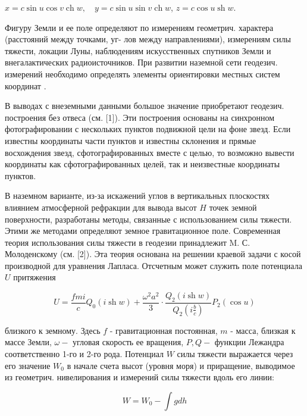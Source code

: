 \documentclass[10pt]{article}
\begin{document}
$x=c \sin u \cos v \operatorname{ch} w, \quad y=c \sin u \sin v \operatorname{ch} w$, $z=c \cos u \operatorname{sh} w$.



Фигуру Земли и ее поле определяют по измерениям геометрич. характера (расстояний между точками, уг- лов между направлениями), измерениям силы тяжести, локации Луны, наблюдениям искусственных спутников Земли и внегалактических радиоисточников. При развитии наземной сети геодезич. измерений необходимо определять элементы ориентировки местных систем координат .



В выводах с внеземными данными большое значение приобретают геодезич. построения без отвеса (см. [1]). Эти построения основаны на синхронном фотографировании с нескольких пунктов подвижной цели на фоне звезд. Если известны координаты части пунктов и известны склонения и прямые восхождения звезд, сфотографированных вместе с целью, то возможно вывести координаты как сфотографированных целей, так и неизвестные координаты пунктов.



В наземном варианте, из-за искажений углов в вертикальных плоскостях влиянием атмосферной рефракции для вывода высот $H$ точек земной поверхности, разработаны методы, связанные с использованием силы тяжести. Этими же методами определяют земное гравитационное поле. Современная теория использования силы тяжести в геодезии принадлежит M. С. Молоденскому (см. [2]). Эта теория основана на решении краевой задачи с косой производной для уравнения Лапласа. Отсчетным может служить поле потенциала $U$ притяжения



\[

U=\frac{f m i}{c} Q_{0}(i \operatorname{sh} w)+\frac{\omega^{2} a^{2}}{3} \cdot \frac{Q_{2}(i \operatorname{sh} w)}{Q_{2}\left(i \frac{b}{c}\right)} P_{2}(\cos u)

\]



близкого к земному. Здесь $f$ - гравитационная постоянная, $m$ - масса, близкая к массе Земли, $\omega-$ угловая скорость ее вращения, $P, Q-$ функции Лежандра соответственно 1-го и 2-го рода. Потенциал $W$ силы тяжести выражается через его значение $W_{0}$ в начале счета высот (уровня моря) и приращение, выводимое из геометрич. нивелирования и измерений силы тяжести вдоль его линии:



\[

W=W_{0}-\int g d h

\]
\end{document}
